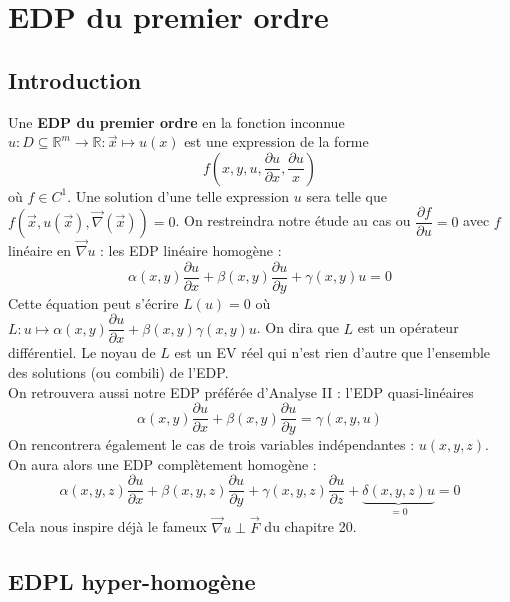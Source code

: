 \chapter{EDP du premier ordre}
\section{Introduction}
Une \textbf{EDP du premier ordre} en la fonction inconnue $u : D \subseteq 
\mathbb{R}^m\rightarrow\mathbb{R} : \vec{x}\mapsto u(x)$ est une 
expression de la forme
\begin{equation}
f\left(x,y,u,\dfrac{\partial u}{\partial  x},\dfrac{\partial  u}{x}\right)
\end{equation}
où $f \in C^1$. Une solution d'une telle expression $u$ sera telle que $
f(\vec{x},u(\vec{x}),\vec\nabla(\vec{x}))=0$. On restreindra notre étude 
au cas ou $\dfrac{\partial f}{\partial u}=0$ avec $f$ linéaire en $\vec 
\nabla u$ : les EDP linéaire  homogène :
\begin{equation}
\alpha(x,y)\dfrac{\partial u}{\partial x}+\beta(x,y)\dfrac{\partial u}{
\partial y}+\gamma(x,y)u = 0
\end{equation}
Cette équation peut s'écrire $L(u)=0$ où $L : u\mapsto \alpha(x,y)
\dfrac{\partial u}{\partial x}+\beta(x,y)\gamma(x,y)u$. On dira que 
$L$ est un opérateur différentiel. Le noyau de $L$ est un EV réel qui 
n'est rien d'autre que l'ensemble des solutions (ou combili) de l'EDP.\\

On retrouvera aussi notre EDP préférée d'Analyse II : l'EDP quasi-linéaires 
\begin{equation}
\alpha(x,y)\dfrac{\partial u}{\partial x}+\beta(x,y)\dfrac{\partial u}{
\partial y} = \gamma(x,y,u)
\end{equation}
On rencontrera également le cas de trois variables indépendantes : $u(x,
y,z)$. On aura alors une EDP complètement homogène :
\begin{equation}
\alpha(x,y,z)\dfrac{\partial u}{\partial x}+\beta(x,y,z)\dfrac{\partial 
u}{\partial y} + \gamma(x,y,z)\dfrac{\partial u}{\partial z}+
\underbrace{\delta(x,y,z)u}_{=0}=0
\end{equation}
Cela nous inspire déjà le fameux $\vec \nabla u \perp\vec{F}$ du chapitre 
20.

\section{EDPL hyper-homogène}
	\setcounter{subsection}{1}
